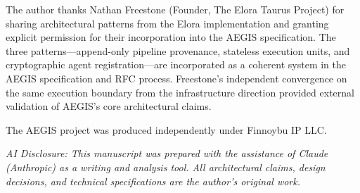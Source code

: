 \documentclass{IEEEcsmag}
\begin{document}
The author thanks Nathan Freestone (Founder, The Elora Taurus Project) for sharing architectural patterns from the Elora implementation and granting explicit permission for their incorporation into the AEGIS specification. The three patterns---append-only pipeline provenance, stateless execution units, and cryptographic agent registration---are incorporated as a coherent system in the AEGIS specification and RFC process. Freestone's independent convergence on the same execution boundary from the infrastructure direction provided external validation of AEGIS's core architectural claims.

The AEGIS project was produced independently under Finnoybu IP LLC.

{\it AI Disclosure: This manuscript was prepared with the assistance of Claude (Anthropic) as a writing and analysis tool. All architectural claims, design decisions, and technical specifications are the author's original work.}
\end{document}
